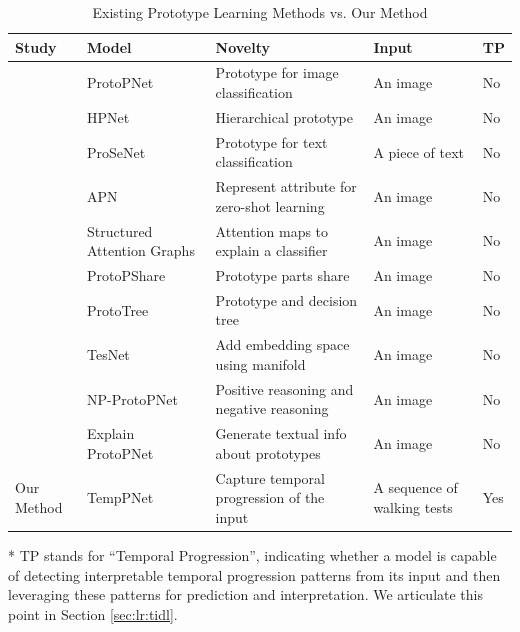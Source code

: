 \documentclass[mnsc]{informs3b} %
\newcommand\Tstrut{\rule{0pt}{2.6ex}}         %
\begin{document}
\begin{table}[h]
\centering
\caption{Existing Prototype Learning Methods vs. Our Method}
\label{tb:prototypelearning}
\small
\begin{threeparttable}
\begin{tabular}{lL{85pt}L{140pt}L{75pt}L{15pt}}
\toprule
  Study & Model & Novelty & Input &  TP\tnote{*}\\ \midrule
 \cite{chen_this_2019}& ProtoPNet & Prototype for image classification & An image &  No\\
 \cite{hase_interpretable_2019}& HPNet & Hierarchical prototype & An image &  No\\
 \cite{ming_interpretable_2019}& ProSeNet & Prototype for text classification & A piece of text & No \\
 \cite{xu_attribute_2020}& APN & Represent attribute for zero-shot learning & An image &  No \\
 \cite{shitole_one_2021}& Structured Attention Graphs & Attention maps to explain a classifier & An image & No \Tstrut \\
 \cite{rymarczyk_protopshare_2021}& ProtoPShare & Prototype parts share & An image & No \\
 \cite{nauta_neural_2021}& ProtoTree & Prototype and decision tree & An image & No \\
 \cite{wang_interpretable_2021}& TesNet & Add embedding space using manifold & An image & No \\
 \cite{singh_these_2021}& NP-ProtoPNet & Positive reasoning and negative reasoning & An image & No \\
 \cite{nauta_this_2021}& Explain ProtoPNet & Generate textual info about prototypes & An image & No \\


 Our Method& TempPNet & Capture temporal progression of the input & A sequence of walking tests & 
 Yes \\ \bottomrule
\end{tabular}
\begin{tablenotes}\footnotesize
    \item[*] TP stands for ``Temporal Progression'', indicating whether a model is capable of detecting interpretable temporal progression patterns from its input and then leveraging these patterns for prediction and interpretation. We articulate this point in Section \ref{sec:lr:tidl}.
\end{tablenotes}
\end{threeparttable}
\end{table}
\end{document}
